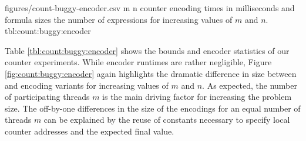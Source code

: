 

\newcommand{\CountRowHeader}[1]{\StrSubstitute{#1}{ }{\hfill}}


\bigbreak

\EncoderStatsTable
  {figures/count-buggy-encoder.csv}
  {m n}
  {\CountRowHeader}
  { counter encoding times in milliseconds and formula sizes  the number of expressions for increasing values of $m$ and $n$.}
  {tbl:count:buggy:encoder}

Table \ref{tbl:count:buggy:encoder} shows the bounds and encoder statistics of our  counter experiments.
While encoder runtimes are rather negligible, Figure \ref{fig:count:buggy:encoder} again highlights the dramatic difference in size between {\BTOR} and {\SMTLIB} encoding variants for increasing values of $m$ and $n$. %
As expected, the number of participating threads $m$ is the main driving factor for
increasing the problem size.
The off-by-one differences in the size of the {\BTOR} encodings for an equal number of threads $m$ can be explained by the reuse of constants necessary to specify local counter addresses and the expected final value.

